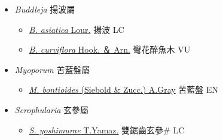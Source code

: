 
  \begin{itemize}
 \item[] \textit{Buddleja} 揚波屬
                    
  \begin{itemize}
        \item[] \href{http://www.theplantlist.org/tpl1.1/search?q=Buddleja+asiatica}{\textit{B. asiatica} Lour.}   揚波 LC
        \item[] \href{http://www.theplantlist.org/tpl1.1/search?q=Buddleja+curviflora}{\textit{B. curviflora} Hook. ＆ Arn.}   彎花醉魚木 VU
  \end{itemize}
 \item[] \textit{Myoporum} 苦藍盤屬
                    
  \begin{itemize}
        \item[] \href{http://www.theplantlist.org/tpl1.1/search?q=Myoporum+bontioides}{\textit{M. bontioides} (Siebold \& Zucc.) A.Gray}   苦藍盤 EN
  \end{itemize}
 \item[] \textit{Scrophularia} 玄參屬
                    
  \begin{itemize}
        \item[] \href{http://www.theplantlist.org/tpl1.1/search?q=Scrophularia+yoshimurae}{\textit{S. yoshimurae} T.Yamaz.}   雙鋸齒玄參\# LC
  \end{itemize}
  \end{itemize}
